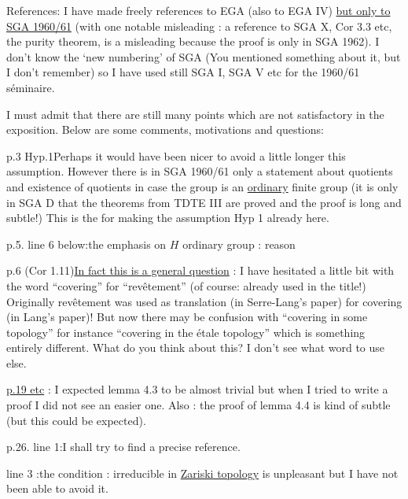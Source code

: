 References: I have made freely references to EGA (also to EGA IV) \uline{but only to SGA 1960/61} (with one notable misleading : a reference to SGA X, Cor 3.3 etc, the purity theorem, is a misleading because the proof is only in SGA 1962). I don't know the `new numbering' of SGA (You mentioned something about it, but I don't remember) so I have used still SGA I, SGA V etc for the 1960/61 séminaire.

I must admit that there are still many points which are not satisfactory in the exposition. Below are some comments, motivations and questions:

p.3 Hyp.1\quad Perhaps it would have been nicer to avoid a little longer this assumption. However there is in SGA 1960/61 only a statement about quotients and existence of quotients in case the group is an \uline{ordinary} finite group (it is only in SGA D that the theorems from TDTE III are proved and the proof is long and subtle!) This is the  for making the assumption Hyp 1 already here.

p.5. line 6 below:\quad the emphasis on $H$ ordinary group :  reason

p.6 (Cor 1.11)\quad \uline{In fact this is a general question} : I have hesitated a little bit with the word ``covering'' for ``revêtement'' (of course: already used in the title!) Originally revêtement was used as translation  (in Serre-Lang's paper) for covering (in Lang's paper)! But now there may be confusion with ``covering in some topology'' for instance ``covering in the étale topology'' which is something entirely different. What do you think about this? I don't see what
word to use else.

\uline{p.19 etc} : I expected lemma 4.3 to be almost trivial but when I tried to write a proof I did not see an easier one. Also : the proof of lemma 4.4 is kind of subtle (but this could be expected).
\margin{!}

p.26. line 1:\quad I shall try to find a precise reference.

line 3 :\quad the condition : irreducible in \uline{Zariski topology} is unpleasant but I have not been able to avoid it.

